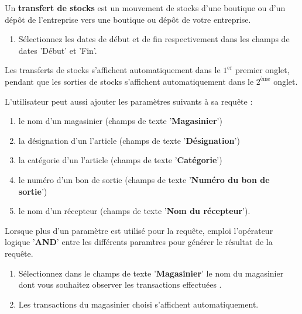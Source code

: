 Un \textbf{transfert de stocks} est un mouvement de stocks
d'une boutique ou d'un d\'ep\^ot de l'entreprise vers une
boutique ou d\'ep\^ot de votre entreprise.



\begin{enumerate}[1)]
	\item S\'electionnez les dates de d\'ebut et de
	fin respectivement dans les champs de dates
	'D\'ebut' et 'Fin'.
\end{enumerate}

Les transferts de stocks s'affichent automatiquement
dans le $1^{\text{er}}$ premier onglet, pendant que
les sorties de stocks s'affichent automatiquement
dans le $2^{\text{\`eme}}$ onglet.	

L'utilisateur peut aussi ajouter les param\`etres suivants
\`a sa requ\^ete :

\begin{enumerate}[1)]
	\item le nom d'un magasinier (champs de texte 
	'\textbf{Magasinier}')
	\item la d\'esignation d'un l'article 
		(champs de texte '\textbf{D\'esignation}')
	\item la cat\'egorie d'un l'article 
		(champs de texte '\textbf{Cat\'egorie}')
	\item le num\'ero d'un bon de sortie 
		(champs de texte '\textbf{Num\'ero du bon de sortie}')
	\item le nom d'un r\'ecepteur
		(champs de texte '\textbf{Nom du r\'ecepteur}').
\end{enumerate}

Lorsque plus d'un param\`etre est utilis\'e pour
la requ\^ete, \yeren emploi l'op\'erateur logique
'\textbf{AND}' entre les diff\'erents param\`tres
pour g\'en\'erer le r\'esultat de la requ\^ete.



\begin{enumerate}[1)]
	\item S\'electionnez dans le champs de texte
	'\textbf{Magasinier}' le nom du magasinier dont
	vous souhaitez observer les transactions effectu\'ees .
	
	\item Les transactions du magasinier choisi
	s'affichent automatiquement.
\end{enumerate}

